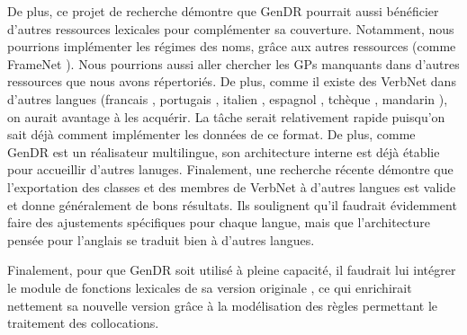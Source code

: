 De plus, ce projet de recherche démontre que GenDR pourrait aussi bénéficier d'autres ressources lexicales pour complémenter sa couverture. Notamment, nous pourrions implémenter les régimes des noms, grâce aux autres ressources (comme FrameNet \cite{FillmoreBackgroundFramenet2003a}). Nous pourrions aussi aller chercher les \acp{GP} manquants dans d'autres ressources que nous avons répertoriés. De plus, comme il existe des VerbNet dans d'autres langues (francais \citep{danlos:hal-01179175}, portugais \citep{ScartoncrosslinguisticVerbNetstylelexicon2012}, italien \citep{busso2016italian}, espagnol \citep{TauleAnCoraNetMappingSpanish2010}, tchèque \citep{pala2008can}, mandarin \citep{liu2008construction}), on aurait avantage à les acquérir. La tâche serait relativement rapide puisqu'on sait déjà comment implémenter les données de ce format. De plus, comme GenDR est un réalisateur multilingue, son architecture interne est déjà établie pour accueillir d'autres lanuges. Finalement, une recherche récente \citep{Majewska2017} démontre que l'exportation des classes et des membres de VerbNet \citep{SchulerVerbnetBroadcoverageComprehensive2005} à d'autres langues est valide et donne généralement de bons résultats. Ils soulignent qu'il faudrait évidemment faire des ajustements spécifiques pour chaque langue, mais que l'architecture pensée pour l'anglais se traduit bien à d'autres langues. 

Finalement, pour que GenDR soit utilisé à pleine capacité, il faudrait lui intégrer le module de fonctions lexicales de sa version originale \citep{LambreyImplementationcollocationspour2017, lareau18}, ce qui enrichirait nettement sa nouvelle version grâce à la modélisation des règles permettant le traitement des collocations.